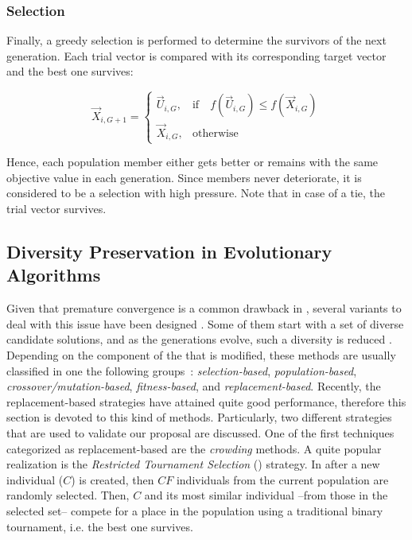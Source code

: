 \subsubsection{Selection}
Finally, a greedy selection is performed to determine the survivors of the next generation.
%
Each trial vector is compared with its corresponding target vector and the best one survives:

\begin{equation} \label{eqn:selection}
\vec{X}_{i,G+1}= 
\begin{cases}
    \vec{U}_{i,G},& \text{if} \quad f(\vec{U}_{i,G}) \leq f(\vec{X}_{i,G})  \\
    \vec{X}_{i,G},              & \text{otherwise}
\end{cases}
\end{equation}

Hence, each population member either gets better or remains with the same objective value in each generation.
%
Since members never deteriorate, it is considered to be a selection with high pressure.
%
Note that in case of a tie, the trial vector survives.

%



\subsection{Diversity Preservation in Evolutionary Algorithms}

Given that premature convergence is a common drawback in  \EAS{}, several variants to deal with this issue have been designed \cite{eshelman1993real}.
%
Some of them start with a set of diverse candidate solutions, and as the generations evolve, such a diversity is reduced \cite{Crepinsek:13}.
%
Depending on the component of the \EA{} that is modified, these methods are usually classified in one the following groups~\cite{Crepinsek:13}: \textit{selection-based}, \textit{population-based}, \textit{crossover/mutation-based}, \textit{fitness-based}, and \textit{replacement-based}.
%
Recently, the replacement-based strategies have attained quite good performance, therefore this section is devoted to this kind
of methods.
%
Particularly, two different strategies that are used to validate our proposal are discussed.
%
One of the first techniques categorized as replacement-based are the \textit{crowding} methods.
%
A quite popular realization is the \textit{Restricted Tournament Selection} \cite{harik1995finding} (\RTS{}) strategy.
%
In \RTS{} after a new individual ($C$) is created, then $CF$ individuals from the current population are randomly selected.
%
Then, $C$ and its most similar individual --from those in the selected set-- compete for a place in the population using a traditional binary tournament, i.e. the best one survives.
%

